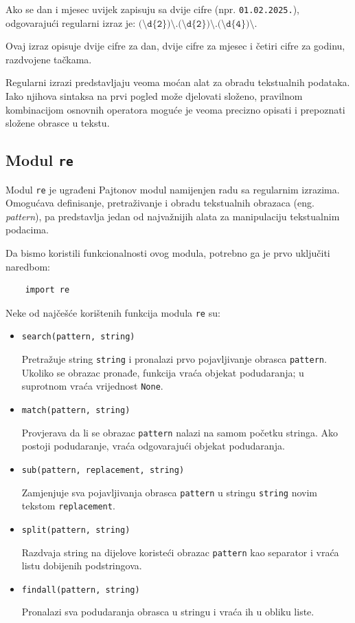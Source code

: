 Ako se dan i mjesec uvijek zapisuju sa dvije cifre (npr. \texttt{01.02.2025.}), odgovarajući regularni izraz je: $
\texttt{(\textbackslash d\{2\})\textbackslash.(\textbackslash d\{2\})\textbackslash.(\textbackslash d\{4\})\textbackslash.} $

Ovaj izraz opisuje dvije cifre za dan, dvije cifre za mjesec i četiri cifre za godinu, razdvojene tačkama.

\bigskip

Regularni izrazi predstavljaju veoma moćan alat za obradu tekstualnih podataka. Iako njihova sintaksa na prvi pogled može djelovati složeno, pravilnom kombinacijom osnovnih operatora moguće je veoma precizno opisati i prepoznati složene obrasce u tekstu.

\subsection{Modul \texttt{re}}

Modul \texttt{re} je ugrađeni Pajtonov modul namijenjen radu sa regularnim izrazima. Omogućava definisanje, pretraživanje i obradu tekstualnih obrazaca (eng. \textit{pattern}), pa predstavlja jedan od najvažnijih alata za manipulaciju tekstualnim podacima.

Da bismo koristili funkcionalnosti ovog modula, potrebno ga je prvo uključiti naredbom:

\begin{verbatim}
	import re
\end{verbatim}

Neke od najčešće korištenih funkcija modula \texttt{re} su:

\begin{itemize}
	
	\item \texttt{search(pattern, string)}
	
	Pretražuje string \texttt{string} i pronalazi prvo pojavljivanje obrasca \texttt{pattern}. Ukoliko se obrazac pronađe, funkcija vraća objekat podudaranja; u suprotnom vraća vrijednost \texttt{None}.
	
	\item \texttt{match(pattern, string)}
	
	Provjerava da li se obrazac \texttt{pattern} nalazi na samom početku stringa. Ako postoji podudaranje, vraća odgovarajući objekat podudaranja.
	
	\item \texttt{sub(pattern, replacement, string)}
	
	Zamjenjuje sva pojavljivanja obrasca \texttt{pattern} u stringu \texttt{string} novim tekstom \texttt{replacement}.
	
	\item \texttt{split(pattern, string)}
	
	Razdvaja string na dijelove koristeći obrazac \texttt{pattern} kao separator i vraća listu dobijenih podstringova.
	
	\item \texttt{findall(pattern, string)}
	
	Pronalazi sva podudaranja obrasca u stringu i vraća ih u obliku liste.
	
\end{itemize}


